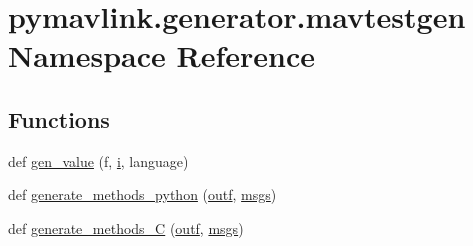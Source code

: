 \hypertarget{namespacepymavlink_1_1generator_1_1mavtestgen}{}\section{pymavlink.\+generator.\+mavtestgen Namespace Reference}
\label{namespacepymavlink_1_1generator_1_1mavtestgen}
\subsection*{Functions}
\begin{DoxyCompactItemize}
\item 
def \mbox{\hyperlink{namespacepymavlink_1_1generator_1_1mavtestgen_ab5f7ec934669efadef3e9665c35a4866}{gen\+\_\+value}} (f, \mbox{\hyperlink{velTest_8cpp_a1239420b8759f52cbab64225b82461e2}{i}}, language)
\item 
def \mbox{\hyperlink{namespacepymavlink_1_1generator_1_1mavtestgen_a383a0b2b58cf23c93d38588c1a63b0f0}{generate\+\_\+methods\+\_\+python}} (\mbox{\hyperlink{namespacepymavlink_1_1generator_1_1mavtestgen_a62d1fc41625a9ec5e92023a59bf698bf}{outf}}, \mbox{\hyperlink{namespacepymavlink_1_1generator_1_1mavtestgen_a57c1b5445619b3fe490684298c5c36c6}{msgs}})
\item 
def \mbox{\hyperlink{namespacepymavlink_1_1generator_1_1mavtestgen_aea36216fc3d20f573590548aeee1a08f}{generate\+\_\+methods\+\_\+C}} (\mbox{\hyperlink{namespacepymavlink_1_1generator_1_1mavtestgen_a62d1fc41625a9ec5e92023a59bf698bf}{outf}}, \mbox{\hyperlink{namespacepymavlink_1_1generator_1_1mavtestgen_a57c1b5445619b3fe490684298c5c36c6}{msgs}})
\end{DoxyCompactItemize}
